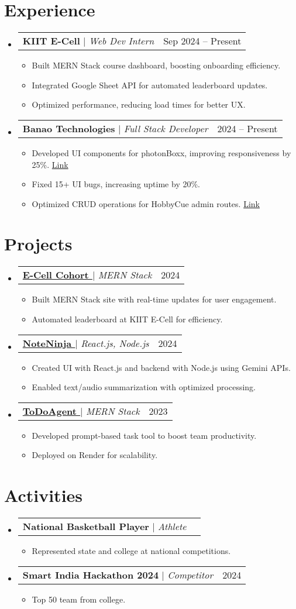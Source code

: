 \documentclass[letterpaper,10pt]{article}
\makeatletter
\newcommand{\resumeItem}[1]{\item\small{#1 \vspace{-3pt}}}
\newcommand{\resumeProjectHeading}[2]{
  \item
  \begin{tabular*}{0.98\textwidth}{l@{\extracolsep{\fill}}r}
    \small#1 & \small#2 \\
  \end{tabular*}\vspace{-6pt}
}
\newcommand{\resumeSubHeadingListStart}{\begin{itemize}[leftmargin=0.1in, label={}]}
\newcommand{\resumeSubHeadingListEnd}{\end{itemize}}
\newcommand{\resumeItemListStart}{\begin{itemize}}
\newcommand{\resumeItemListEnd}{\end{itemize}\vspace{-6pt}}
\makeatother
\begin{document}
\section{Experience}
\resumeSubHeadingListStart
  \resumeProjectHeading{\textbf{KIIT E-Cell} $|$ \emph{Web Dev Intern}}{Sep 2024 -- Present}
  \resumeItemListStart
    \resumeItem{Built MERN Stack course dashboard, boosting onboarding efficiency.}
    \resumeItem{Integrated Google Sheet API for automated leaderboard updates.}
    \resumeItem{Optimized performance, reducing load times for better UX.}
  \resumeItemListEnd
  \resumeProjectHeading{\textbf{Banao Technologies} $|$ \emph{Full Stack Developer}}{2024 -- Present}
  \resumeItemListStart
    \resumeItem{Developed UI components for photonBoxx, improving responsiveness by 25\%. \href{https://sujays-organization-1.gitbook.io/photonboxx-contribution/}{Link}}
    \resumeItem{Fixed 15+ UI bugs, increasing uptime by 20\%.}
    \resumeItem{Optimized CRUD operations for HobbyCue admin routes. \href{https://sujays-organization-1.gitbook.io/untitled/}{Link}}
  \resumeItemListEnd
\resumeSubHeadingListEnd

\section{Projects}
\resumeSubHeadingListStart
  \resumeProjectHeading{\textbf{\href{https://ecohort.vercel.app}{E-Cell Cohort \faExternalLink}} $|$ \emph{MERN Stack}}{2024}
  \resumeItemListStart
    \resumeItem{Built MERN Stack site with real-time updates for user engagement.}
    \resumeItem{Automated leaderboard at KIIT E-Cell for efficiency.}
  \resumeItemListEnd
  \resumeProjectHeading{\textbf{\href{https://note-audio-ninja.vercel.app}{NoteNinja \faExternalLink}} $|$ \emph{React.js, Node.js}}{2024}
  \resumeItemListStart
    \resumeItem{Created UI with React.js and backend with Node.js using Gemini APIs.}
    \resumeItem{Enabled text/audio summarization with optimized processing.}
  \resumeItemListEnd
  \resumeProjectHeading{\textbf{\href{https://todoagent.vercel.app}{ToDoAgent \faExternalLink}} $|$ \emph{MERN Stack}}{2023}
  \resumeItemListStart
    \resumeItem{Developed prompt-based task tool to boost team productivity.}
    \resumeItem{Deployed on Render for scalability.}
  \resumeItemListEnd
\resumeSubHeadingListEnd

\section{Activities}
\resumeSubHeadingListStart
  \resumeProjectHeading{\textbf{National Basketball Player} $|$ \emph{Athlete}}{}
  \resumeItemListStart
    \resumeItem{Represented state and college at national competitions.}
  \resumeItemListEnd
  \resumeProjectHeading{\textbf{Smart India Hackathon 2024} $|$ \emph{Competitor}}{2024}
  \resumeItemListStart
    \resumeItem{Top 50 team from college.}
  \resumeItemListEnd
\resumeSubHeadingListEnd
\end{document}

